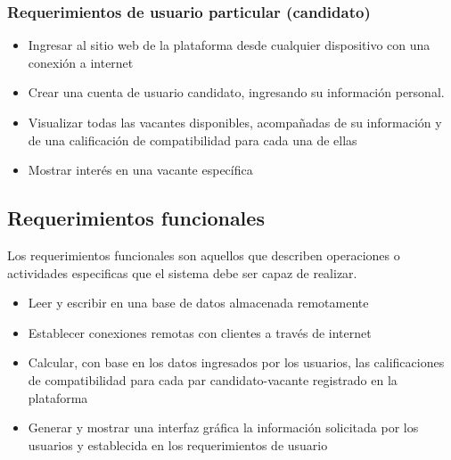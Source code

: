 \subsubsection{Requerimientos de usuario particular (candidato)}
\begin{itemize}
  Para que el sistema sea útil para los usuarios particulares en busca de un empleo, es imprescindible que puedan realizar las siguientes acciones:
    \item Ingresar al sitio web de la plataforma desde cualquier dispositivo con una conexión a internet
    \item Crear una cuenta de usuario candidato, ingresando su información personal.
    \item Visualizar todas las vacantes disponibles, acompañadas de su información y de una calificación de compatibilidad para cada una de ellas
    \item Mostrar interés en una vacante específica
\end{itemize}

\subsection{Requerimientos funcionales}
Los requerimientos funcionales son aquellos que describen operaciones o actividades especificas que el sistema debe ser capaz de realizar.
\begin{itemize}
  Para que el sistema cumpla con los objetivos descritos en la introducción, es imprescindible que pueda realizar las siguientes funciones:
    \item Leer y escribir en una base de datos almacenada remotamente
    \item Establecer conexiones remotas con clientes a través de internet
    \item Calcular, con base en los datos ingresados por los usuarios, las calificaciones de compatibilidad para cada par candidato-vacante registrado en la plataforma
    \item Generar y mostrar una interfaz gráfica la información solicitada por los usuarios y establecida en los requerimientos de usuario
\end{itemize}

